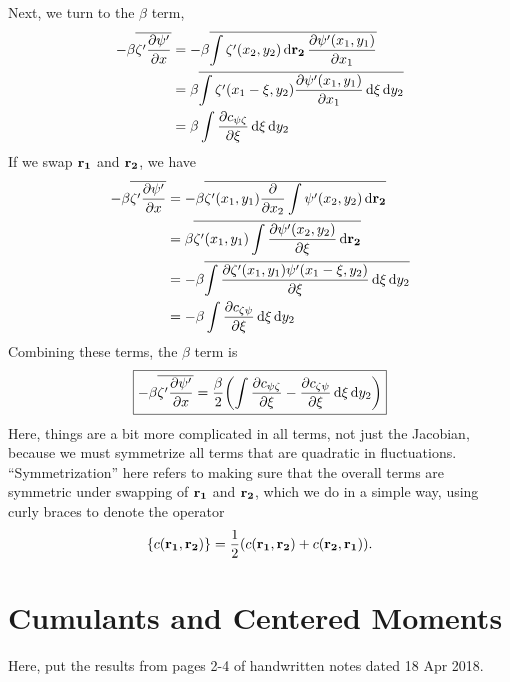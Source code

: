 \documentclass{paper}
\newcommand*{\mean}[1]{\overline{#1}}
\newcommand{\czp}{c_{\zeta\psi}}
\newcommand{\cpz}{c_{\psi\zeta}}
\newcommand{\rr}[1]{\vb{r_{#1}}}
\begin{document}
Next, we turn to the $\beta$ term,
\begin{equation}
  \begin{split}
    -\beta \mean{\zeta' \pdv{\psi'}{x}} &= - \beta \mean{\int \zeta'(x_2, y_2) \dd{\rr2} \pdv{\psi'(x_1, y_1)}{x_1}}\\
    &= \beta \mean{\int \zeta'(x_1 - \xi, y_2) \pdv{\psi'(x_1, y_1)}{x_1} \dd{\xi} \dd{y_2}}\\
    &= \beta \int \pdv{\cpz}{\xi} \dd{\xi} \dd{y_2}
    \end{split}
  \label{eq:2c_beta_term}
\end{equation}
If we swap $\rr1$ and $\rr2$, we have
\begin{equation}
  \begin{split}
    -\beta \mean{\zeta' \pdv{\psi'}{x}} &= - \beta \mean{\zeta'(x_1, y_1) \pdv{x_2} \int  \psi'(x_2, y_2)\dd{\rr2}}\\
    &= \beta \mean{\zeta'(x_1, y_1) \int \pdv{\psi'(x_2, y_2)}{\xi} \dd{\rr2}}\\
    &= -\beta \mean{\int \pdv{\zeta'(x_1, y_1) \psi'(x_1- \xi, y_2)}{\xi} \dd{\xi} \dd{y_2}}\\
    &= -\beta \int \pdv{\czp}{\xi} \dd{\xi} \dd{y_2}
    \end{split}
  \label{eq:2c_beta_term_swap}
\end{equation}
Combining these terms, the $\beta$ term is
\begin{equation}
  \label{eq:2c_final_beta}
  \boxed{-\beta \mean{\zeta' \pdv{\psi'}{x}} = \frac{\beta}{2} \qty(\int \pdv{\cpz}{\xi} -\pdv{\czp}{\xi}  \dd{\xi}\dd{y_2})}
\end{equation}
Here, things are a bit more complicated in all terms, not just the Jacobian, because we must symmetrize all terms that are quadratic in fluctuations. ``Symmetrization'' here refers to making sure that the overall terms are symmetric under swapping of $\rr1$ and $\rr2$, which we do in a simple way, using curly braces to denote the operator
\begin{equation}
  \label{eq:symmetrization}
  \qty{c(\rr1, \rr2)} = \frac{1}{2} \qty(c(\rr1, \rr2) + c(\rr2, \rr1)).
\end{equation}

\section{Cumulants and Centered Moments}
\label{sec:cumul-cent-moments}

Here, put the results from pages 2-4 of handwritten notes dated 18 Apr 2018.
\end{document}
